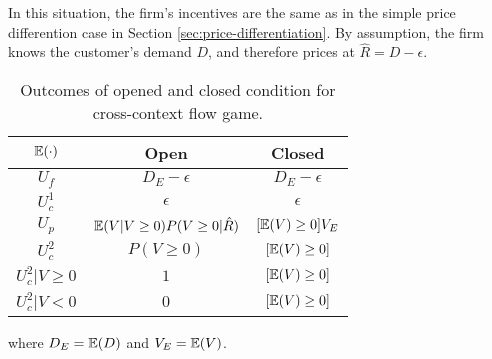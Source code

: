 \documentclass[../thesis.tex]{subfiles}
\begin{document}
In this situation, the firm's incentives are the same
as in the simple price differention
case in Section \ref{sec:price-differentiation}.
By assumption, the firm knows the customer's demand
$D$, and therefore prices at $\hat{R} = D - \epsilon$.

\begin{table}
\begin{center}
\begin{tabular}{ |c|c|c| } 
 \hline
  $\mathbb{E}(\cdot)$ & Open & Closed  \\
 \hline
 $U_f$ & $D_E - \epsilon$ & $D_E - \epsilon$ \\
 $U^1_c$ & $\epsilon$ & $\epsilon$ \\
 $U_p$ & $\mathbb{E}(V \vert V \geq 0) P(V \geq 0 \vert \hat{R})$ & $[\mathbb{E}(V) \geq 0] V_E$  \\
 $U_c^2$ & $P(V \geq 0)$ & $[\mathbb{E}(V) \geq 0]$  \\
 $U_c^2 \vert V \geq 0$ & $1$ & $[\mathbb{E}(V) \geq 0]$  \\
 $U_c^2 \vert V < 0$ & $0$ & $[\mathbb{E}(V) \geq 0]$  \\
 \hline
\end{tabular}
\end{center}
\caption{Outcomes of opened and closed condition for cross-context flow game.}
\end{table}

where $D_E = \mathbb{E}(D)$ and $V_E = \mathbb{E}(V)$.
\end{document}
